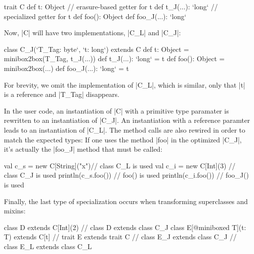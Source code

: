 \begin{lstlisting-nobreak}
 trait C {
   def t: Object // erasure-based getter for t
   def t_J(...): `long` // specialized getter for t
   def foo(): Object
   def foo_J(...): `long`
 }
\end{lstlisting-nobreak}

Now, |C| will have two implementations, |C_L| and |C_J|:


\begin{lstlisting-nobreak}
 class C_J(`T_Tag: byte`, `t: long`) extends C {
   def t: Object = minibox2box(T_Tag, t_J(...))
   def t_J(...): `long` = t
   def foo(): Object = minibox2box(...)
   def foo_J(...): `long` = t
 }
\end{lstlisting-nobreak}

For brevity, we omit the implementation of |C_L|, which is similar, only that |t| is a reference and |T_Tag| disappears.

In the user code, an instantiation of |C| with a primitive type paramater is rewritten to an instantiation of |C_J|. An instantiation with a reference paramter leads to an instantiation of |C_L|. The method calls are also rewired in order to match the expected types: If one uses the method |foo| in the optimized |C_J|, it's actually the |foo_J| method that must be called:

\begin{lstlisting-nobreak}
 val c_s = new C[String]("x")// class C_L is used
 val c_i = new C[Int](3)              // class C_J is used
 println(c_s.foo())   // foo() is used
 println(c_i.foo())   // foo_J() is used
\end{lstlisting-nobreak}

Finally, the last type of specialization occurs when transforming superclasses and mixins:

\begin{lstlisting-nobreak}
 class D extends C[Int](2)
   // class D extends class C_J
 class E[@miniboxed T](t: T) extends C[t]
   // trait E extends trait C
   // class E_J extends class C_J
   // class E_L extends class C_L
\end{lstlisting-nobreak}

